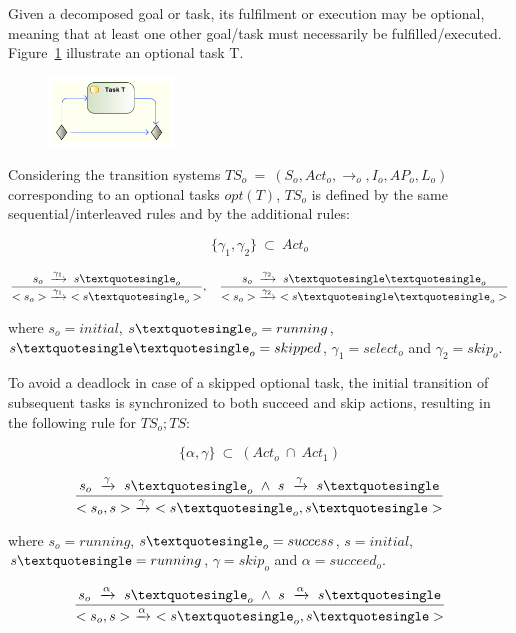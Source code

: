 Given a decomposed goal or task, its fulfilment or execution may be optional, meaning that at least one other goal/task must necessarily be fulfilled/executed. Figure~\ref{fig:UML_OPT_TSK} illustrate an optional task T.

\begin{figure}[ht!]
\centering
\includegraphics[width=0.3\textwidth]{imgs/UML_OPT_TSK.png}
\caption{}
\label{fig:UML_OPT_TSK}
\end{figure}

Considering the transition systems $TS_o\ =\ (S_o, Act_o, \rightarrow_o, I_o, AP_o, L_o)$ corresponding to an optional tasks $opt(T)$, $TS_o$ is defined by the same sequential/interleaved rules and by the additional rules:

$$\{\gamma_1,\gamma_2\}\ \subset\ Act_o$$

$$\frac{s_o\ \xrightarrow{\gamma_1}\ s\textquotesingle_o}{<s_o>\ \xrightarrow{\gamma_1}\ <s\textquotesingle_o>},\quad \frac{s_o\ \xrightarrow{\gamma_2}\ s\textquotesingle\textquotesingle_o}{<s_o>\ \xrightarrow{\gamma_2}\ <s\textquotesingle\textquotesingle_o>}$$
\medskip

\noindent
where $s_o = initial$, $s\textquotesingle_o = running$, $s\textquotesingle\textquotesingle_o = skipped$, $\gamma_1 = select_o$ and $\gamma_2 = skip_o$.
\medskip

To avoid a deadlock in case of a skipped optional task, the initial transition of subsequent tasks is synchronized to both succeed and skip actions, resulting in the following rule for $TS_o;TS$:

$$\{\alpha, \gamma\}\ \subset\ (Act_o\ \cap\ Act_1)$$

$$\frac{s_o\ \xrightarrow{\gamma}\ s\textquotesingle_o\ \wedge\ s\ \xrightarrow{\gamma}\ s\textquotesingle}{<s_o, s>\ \xrightarrow{\gamma}\ <s\textquotesingle_o, s\textquotesingle>}$$
\medskip

\noindent
where $s_o = running$, $s\textquotesingle_o = success$, $s = initial$, $s\textquotesingle = running$, $\gamma = skip_o$ and  $\alpha = succeed_o$.
\medskip

$$\frac{s_o\ \xrightarrow{\alpha}\ s\textquotesingle_o\ \wedge\ s\ \xrightarrow{\alpha}\ s\textquotesingle}{<s_o, s>\ \xrightarrow{\alpha}\ <s\textquotesingle_o, s\textquotesingle>}$$
\medskip


